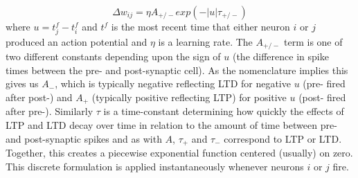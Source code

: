 \begin{equation*}
\Delta w_{ij}  = \eta A_{+/-} exp(-|u| \tau_{+/-})
\end{equation*}
where $u = t^f_j-t^f_i$ and $t^f$ is the most recent time that either neuron $i$ or $j$ produced an action potential and $\eta$ is a learning rate. The $A_{+/-}$ term is one of two different constants depending upon the sign of $u$ (the difference in spike times between the pre- and post-synaptic cell). As the nomenclature implies this gives us $A_-$, which is typically negative reflecting LTD for negative $u$ (pre- fired after post-) and $A_+$ (typically positive reflecting LTP) for positive $u$ (post- fired after pre-). Similarly $\tau$ is a time-constant determining how quickly the effects of LTP and LTD decay over time in relation to the amount of time between pre- and post-synaptic spikes and as with $A$, $\tau_+$ and $\tau_-$ correspond to LTP or LTD. Together, this creates a piecewise exponential function centered (usually) on zero. This discrete formulation is applied instantaneously whenever neurons $i$ or $j$ fire. 







%	
%	



